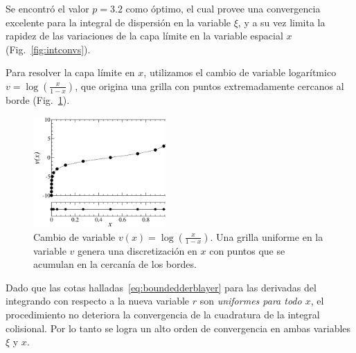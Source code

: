 Se encontró el valor $p=3.2$ como óptimo, el cual 
provee una convergencia excelente para la integral 
de dispersión en la variable $\xi$, y a su vez limita la rapidez 
de las variaciones de la capa límite en la variable espacial $x$ (Fig.~\ref{fig:intconvs}). 

Para resolver la capa límite en $x$, utilizamos 
el cambio de variable logarítmico $v=\log(\frac{x}{1-x})$, 
que origina una grilla con puntos extremadamente cercanos al borde (Fig.~\ref{fig:pindonga}). 
\begin{figure}
  \includegraphics[width=0.45\textwidth]{figuras/puntos.eps}
  \caption{Cambio de variable $v(x) = \log \left( \frac{x}{1-x} \right)$. 
  Una grilla uniforme en la variable $v$ genera una discretización en $x$ 
  con puntos que se acumulan en la cercanía de los bordes.}
 \label{fig:pindonga}
\end{figure}
Dado que las cotas halladas~\eqref{eq:boundedderblayer} para las derivadas del 
integrando con respecto a la nueva variable $r$ son {\em uniformes para todo $x$},  
el procedimiento no deteriora la convergencia de la 
cuadratura de la integral colisional.  Por lo tanto 
se logra un alto orden de convergencia en ambas variables $\xi$ y $x$.

